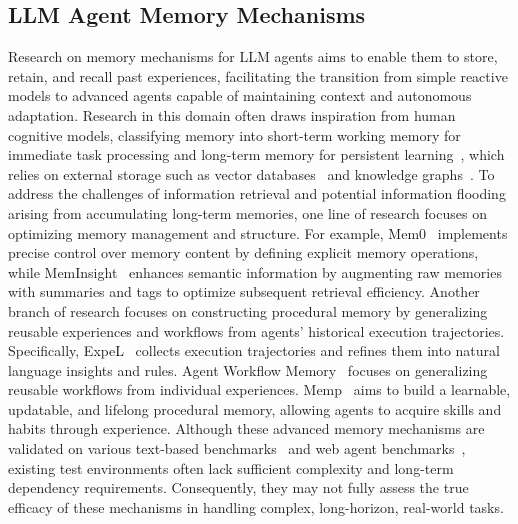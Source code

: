 \subsection{LLM Agent Memory Mechanisms}
Research on memory mechanisms for LLM agents aims to enable them to store, retain, and recall past experiences, facilitating the transition from simple reactive models to advanced agents capable of maintaining context and autonomous adaptation. Research in this domain often draws inspiration from human cognitive models, classifying memory into short-term working memory for immediate task processing and long-term memory for persistent learning~\citep{krishnan2025ai}, which relies on external storage such as vector databases~\citep{douze2024faiss} and knowledge graphs~\citep{webber2012programmatic}. To address the challenges of information retrieval and potential information flooding arising from accumulating long-term memories, one line of research focuses on optimizing memory management and structure. For example, Mem0~\citep{chhikara2025mem0} implements precise control over memory content by defining explicit memory operations, while MemInsight~\citep{salama2025meminsight} enhances semantic information by augmenting raw memories with summaries and tags to optimize subsequent retrieval efficiency. Another branch of research focuses on constructing procedural memory by generalizing reusable experiences and workflows from agents' historical execution trajectories. Specifically, ExpeL~\citep{zhao2024expel} collects execution trajectories and refines them into natural language insights and rules. Agent Workflow Memory~\citep{wang2024agent} focuses on generalizing reusable workflows from individual experiences. Memp~\citep{fang2025memp} aims to build a learnable, updatable, and lifelong procedural memory, allowing agents to acquire skills and habits through experience. Although these advanced memory mechanisms are validated on various text-based benchmarks~\citep{yang2018hotpotqa, shridhar2020alfworld, yao2022webshop, thorne2018fever} and web agent benchmarks~\citep{zhou2023webarena, deng2023mind2web}, existing test environments often lack sufficient complexity and long-term dependency requirements. Consequently, they may not fully assess the true efficacy of these mechanisms in handling complex, long-horizon, real-world tasks.